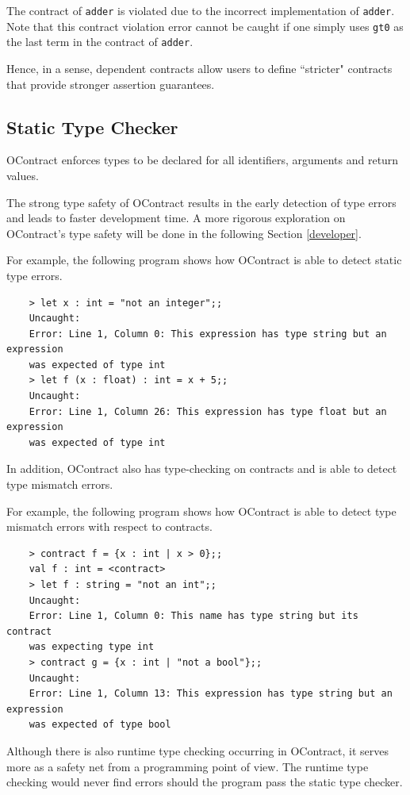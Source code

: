 \documentclass[a4paper]{article}
\begin{document}
The contract of \texttt{adder} is violated due to the incorrect implementation of \texttt{adder}.
Note that this contract violation error cannot be caught if one simply uses \texttt{gt0} as the last term in the contract of \texttt{adder}.

Hence, in a sense, dependent contracts allow users to define ``stricter" contracts that provide stronger assertion guarantees.

\subsection{Static Type Checker}

OContract enforces types to be declared for all identifiers, arguments and return values.

The strong type safety of OContract results in the early detection of type errors and leads to faster development time.
A more rigorous exploration on OContract's type safety will be done in the following Section \ref{developer}.

For example, the following program shows how OContract is able to detect static type errors.

\begin{verbatim}
    > let x : int = "not an integer";;
    Uncaught:
    Error: Line 1, Column 0: This expression has type string but an expression
    was expected of type int
    > let f (x : float) : int = x + 5;;
    Uncaught:
    Error: Line 1, Column 26: This expression has type float but an expression
    was expected of type int
\end{verbatim}

In addition, OContract also has type-checking on contracts and is able to detect type mismatch errors.

For example, the following program shows how OContract is able to detect type mismatch errors with respect to contracts.

\begin{verbatim}
    > contract f = {x : int | x > 0};;
    val f : int = <contract>
    > let f : string = "not an int";;
    Uncaught:
    Error: Line 1, Column 0: This name has type string but its contract
    was expecting type int
    > contract g = {x : int | "not a bool"};;
    Uncaught:
    Error: Line 1, Column 13: This expression has type string but an expression
    was expected of type bool
\end{verbatim}

Although there is also runtime type checking occurring in OContract, it serves more as a safety net from a programming point of view.
The runtime type checking would never find errors should the program pass the static type checker.
\end{document}
